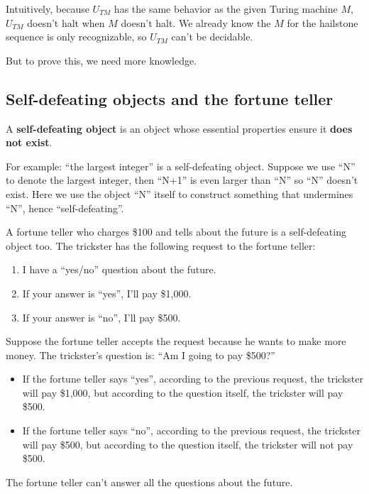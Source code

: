 \documentclass[12pt, letterpaper, oneside]{book}
\begin{document}
Intuitively, because $U_{TM}$ has the same behavior as the given Turing machine $M$, $U_{TM}$ doesn't halt when $M$
doesn't halt. We already know the $M$ for the hailstone sequence is only recognizable, so $U_{TM}$ can't be decidable.

But to prove this, we need more knowledge.

\subsection{Self-defeating objects and the fortune teller}

A \textbf{self-defeating object} is an object whose essential properties ensure it \textbf{does not exist}.

For example: ``the largest integer'' is a self-defeating object. Suppose we use ``N'' to denote the largest integer,
then ``N+1'' is even larger than ``N'' so ``N'' doesn't exist. Here we use the object ``N'' itself to construct
something that undermines ``N'', hence ``self-defeating''.

A fortune teller who charges \$100 and tells about the future is a self-defeating object too. The
trickster has the following request to the fortune teller:
\begin{enumerate}
  \item I have a ``yes/no'' question about the future.
  \item If your answer is ``yes'', I'll pay \$1,000.
  \item If your answer is ``no'', I'll pay \$500.
\end{enumerate}

Suppose the fortune teller accepts the request because he wants to make more money. The trickster's question is:
``Am I going to pay \$500?''
\begin{itemize}
  \item If the fortune teller says ``yes'', according to the previous request, the trickster will pay \$1,000, but
        according to the question itself, the trickster will pay \$500.
  \item If the fortune teller says ``no'', according to the previous request, the trickster will pay \$500, but
        according to the question itself, the trickster will not pay \$500.
\end{itemize}

The fortune teller can't answer all the questions about the future.
\end{document}
